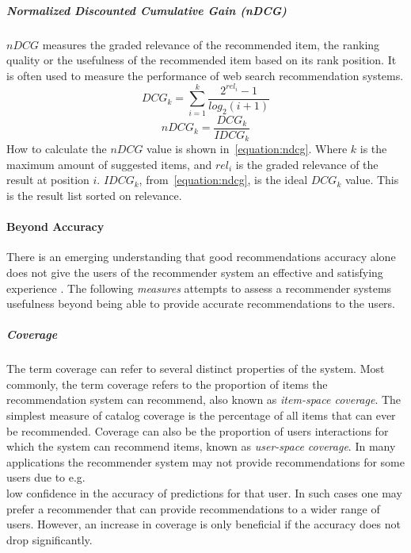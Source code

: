 \subparagraph{Normalized Discounted Cumulative Gain (nDCG)}
\label{subp:normalized_discounted_cumulative_gain_}
$nDCG$ measures the graded relevance of the recommended item, the ranking quality or the usefulness of the recommended item based on its rank position.
It is often used to measure the performance of web search recommendation systems.
\begin{equation}
    DCG_k = \sum_{i=1}^{k}{\frac{2^{rel_i}-1}{log_2(i+1)}}
    \label{equation:dcg}
\end{equation}
\begin{equation}
    nDCG_k = \frac{DCG_k}{IDCG_k}
    \label{equation:ndcg}
\end{equation}
How to calculate the $nDCG$ value is shown in~\ref{equation:ndcg}.
Where $k$ is the maximum amount of suggested items, and $rel_i$ is the graded relevance of the result at position $i$.
$IDCG_k$, from~\ref{equation:ndcg}, is the ideal $DCG_k$ value.
This is the result list sorted on relevance.



\paragraph{Beyond Accuracy}

There is an emerging understanding that good recommendations accuracy alone does not give the users of the recommender system an effective and satisfying experience \cite{Herlocker2004}. The following \emph{measures} attempts to assess a recommender systems usefulness beyond being able to provide accurate recommendations to the users.

\subparagraph{Coverage}

The term coverage can refer to several distinct properties of the system. Most
commonly, the term coverage refers to the proportion of items the
recommendation system can recommend, also known as \emph{item-space coverage}.
The simplest measure of catalog coverage is the percentage of all items that
can ever be recommended. Coverage can also be the proportion of users
interactions for which the system can recommend items, known as
\emph{user-space coverage}. In many applications the recommender system may not
provide recommendations for some users due to e.g.\\ low confidence in the
accuracy of predictions for that user. In such cases one may prefer a
recommender that can provide recommendations to a wider range of users. However, an increase in coverage is only beneficial if the accuracy does not drop significantly.

